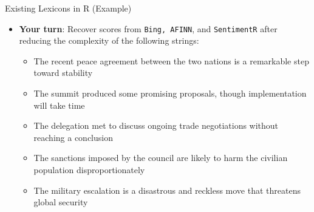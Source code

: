 \documentclass[
  ignorenonframetext,
  aspectratio=169]{beamer}
\begin{document}
\begin{frame}{Existing Lexicons in R (Example)}
\label{existing-lexicons-in-r-example}
\begin{itemize}
\item \textbf{Your turn}: Recover scores from \texttt{Bing, AFINN}, and \texttt{SentimentR} after reducing the complexity of the following strings: 
\footnotesize
  \begin{itemize}
  \item The recent peace agreement between the two nations is a remarkable step toward stability
  \item The summit produced some promising proposals, though implementation will take time
  \item The delegation met to discuss ongoing trade negotiations without reaching a conclusion
  \item The sanctions imposed by the council are likely to harm the civilian population disproportionately
  \item The military escalation is a disastrous and reckless move that threatens global security
  \end{itemize}
\end{itemize}
\end{frame}
\end{document}
